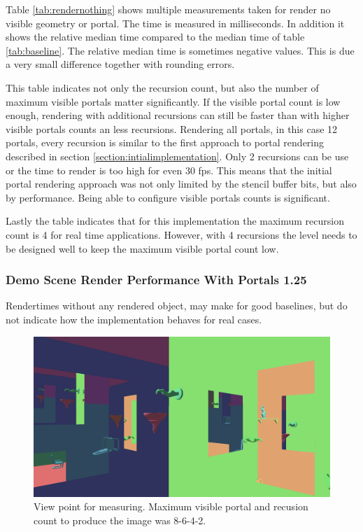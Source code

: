 Table \ref{tab:rendernothing} shows multiple measurements taken for render no visible geometry or portal. The time is measured in milliseconds. In addition it shows the relative median time compared to the median time of table \ref{tab:baseline}. The relative median time is sometimes negative values. This is due a very small difference together with rounding errors.

This table indicates not only the recursion count, but also the number of maximum visible portals matter significantly. If the visible portal count is low enough, rendering with additional recursions can still be faster than with higher visible portals counts an less recursions. Rendering all portals, in this case 12 portals, every recursion is similar to the first approach to portal rendering described in section \ref{section:intialimplementation}. Only 2 recursions can be use or the time to render is too high for even 30 \gls{fps}. This means that the initial portal rendering approach was not only limited by the stencil buffer bits, but also by performance. Being able to configure visible portals counts is significant.

Lastly the table indicates that for this implementation the maximum recursion count is 4 for real time applications. However, with 4 recursions the level needs to be designed well to keep the maximum visible portal count low.






\subsubsection{Demo Scene Render Performance With Portals 1.25}
\label{section:renderperformance}

Rendertimes without any rendered object, may make for good baselines, but do not indicate how the implementation behaves for real cases.  

\begin{figure}[H]
	\includegraphics[width=\linewidth]{images/testsnapshot.png}
	\caption{View point for measuring. Maximum visible portal and recusion count to produce the image was 8-6-4-2.}
	\label{fig:perfviewpoint}
\end{figure}

